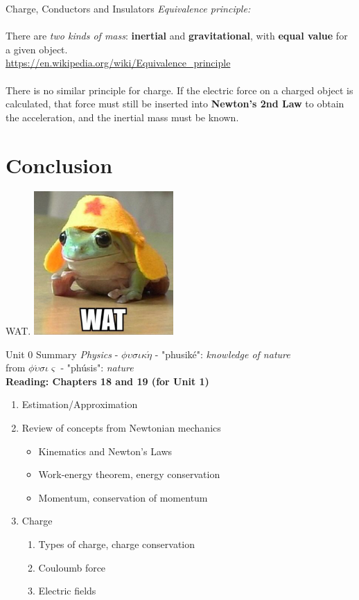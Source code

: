 \documentclass{beamer}
\begin{document}
\begin{frame}{Charge, Conductors and Insulators}
\small
\textit{Equivalence principle:} \\ \hrulefill \\
There are \textit{two kinds of mass}: \textbf{inertial} and \textbf{gravitational}, with \textbf{equal value} for a given object. \\ \vspace{0.5cm}
\url{https://en.wikipedia.org/wiki/Equivalence_principle} \\
\hrulefill \\
There is no similar principle for charge.  If the electric force on a charged object is calculated, that force must still be inserted into \textbf{Newton's 2nd Law} to obtain the acceleration, and the inertial mass must be known.
\end{frame}

\section{Conclusion}

\begin{frame}{WAT.}
\centering
\includegraphics[width=0.4\textwidth]{figures/frogs-know-wats.png}
\end{frame}

\begin{frame}{Unit 0 Summary}
\textit{Physics} - $\phi\upsilon\sigma\iota\kappa\acute{\eta}$ - "phusik\'e": \textit{knowledge of nature} \\
from $\phi\acute{\upsilon}\sigma\iota\varsigma$ - "ph\'usis": \textit{nature} \\
\textbf{Reading: Chapters 18 and 19 (for Unit 1)}
\begin{enumerate}
\item Estimation/Approximation
\item Review of concepts from Newtonian mechanics
\begin{itemize}
\item Kinematics and \alert{Newton's Laws}
\item Work-energy theorem, energy conservation
\item Momentum, conservation of momentum
\end{itemize}
\item Charge
\begin{enumerate}
\item Types of charge, charge conservation
\item Couloumb force
\item Electric fields
\end{enumerate}
\end{enumerate}
\end{frame}
\end{document}
